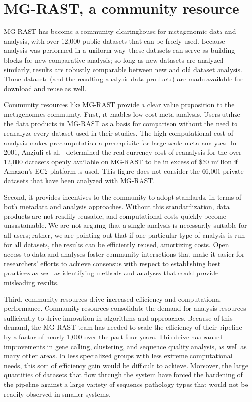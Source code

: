 \documentclass[12pt,fullpage]{report}
\begin{document}
\section{MG-RAST, a community resource}
MG-RAST has become a community clearinghouse for metagenomic data and analysis, with over 12,000 public datasets that can be freely used. Because analysis was performed in a uniform way, these datasets can serve as building blocks for new comparative analysis; so long as new datasets are analyzed similarly, results are robustly comparable between new and old dataset analysis. These datasets (and the resulting analysis data products) are made available for download and reuse as well.

Community resources like MG-RAST provide a clear value proposition to the metagenomics community. First, it enables low-cost meta-analysis. Users utilize the data products in MG-RAST as a basis for comparison without the need to reanalyze every dataset used in their studies. The high computational cost of analysis \cite{MGCLOUD} makes precomputation a prerequisite for large-scale meta-analyses. In 2001, Angiuli et al.~\cite{CLOVR} determined the real currency cost of reanalysis for the over 12,000 datasets openly available on MG-RAST to be in excess of \$30 million if Amazon's EC2 platform is used.
This figure does not consider the 66,000 private datasets that have been analyzed with MG-RAST.

Second, it provides incentives to the community to adopt standards, in terms of both  metadata and analysis approaches. Without this standardization, data products are not readily reusable, and computational costs quickly become unsustainable. We are not arguing that a single analysis is necessarily suitable for all users; rather, we are pointing out that if one particular type of analysis is run for all datasets, the results can be efficiently reused, amortizing costs. Open access to data and analyses foster community interactions that make it easier for researchers' efforts to achieve consensus with respect to establishing best practices as well as identifying methods and analyses that could provide misleading results.

Third, community resources drive increased efficiency and computational performance. Community resources consolidate the demand for analysis resources sufficiently to drive innovation in algorithms and approaches. Because of this demand, the MG-RAST team has needed to scale the efficiency of their pipeline by a factor of nearly 1,000 over the past four years. This drive has caused improvements in gene calling, clustering, and sequence quality analysis, as well as many other areas. In less specialized groups with less extreme computational needs, this sort of efficiency gain would be difficult to achieve. Moreover, the large quantities of datasets that flow through the system have forced the hardening of the pipeline against a large variety of sequence pathology types that would not be readily observed in smaller systems.
\end{document}
